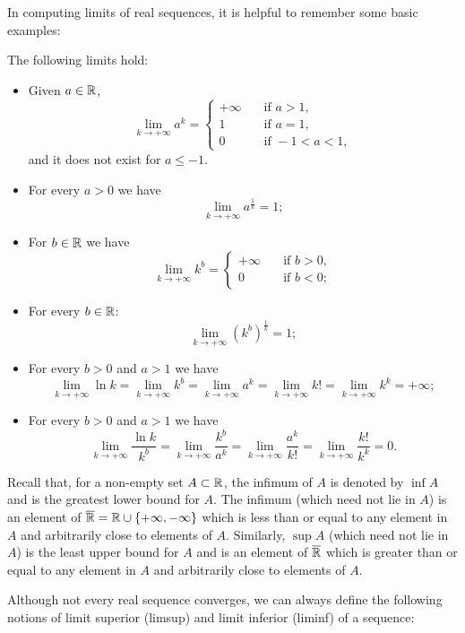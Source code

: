 \bigskip
In computing limits of real sequences, it is helpful to remember some basic examples:
\bigskip
\begin{proposition} The following limits hold:
	\begin{itemize}
		\item Given $a\in \mathbb{R}$,
		$$
		\lim_{k\to +\infty} a^k = 
		\begin{cases}
		+ \infty \quad & \textrm{if } a>1,\\
		1 \quad & \textrm{if } a=1,\\
		0 \quad & \textrm{if } -1 < a < 1,
		\end{cases}
		$$
		and it does not exist for $a\leq -1$.
		\item For every $a>0$ we have 
		$$
		\lim_{k\to +\infty} a^{\frac1k} =1;
		$$
		\item For $b\in \mathbb{R}$ we have 
		$$
		\lim_{k\to +\infty} k^b = \begin{cases}
		+\infty \quad & \textrm{if } b>0,\\
		0 \quad & \textrm{if } b<0;
		\end{cases}
		$$
		\item For every $b\in \mathbb{R}$:
		$$
		\lim_{k\to +\infty} (k^b)^{\frac1k} =1;
		$$
		\item For every $b>0$ and $a>1$ we have 
		$$
		\lim_{k\to +\infty} \ln k = \lim_{k\to +\infty} k^b = \lim_{k\to +\infty} a^k = \lim_{k\to +\infty} k! = \lim_{k\to +\infty} k^k = +\infty;
		$$
		\item For every $b>0$ and $a>1$ we have 
		$$
		\lim_{k\to +\infty} \frac{\ln k}{k^b} = \lim_{k\to +\infty} \frac{k^b}{a^k} = \lim_{k\to +\infty} \frac{a^k}{k!} = \lim_{k\to +\infty} \frac{k!}{k^k} =0. 
		$$
	\end{itemize}

\bigskip
\begin{remark}
	Recall that, for a non-empty set $A\subset \mathbb{R} $, the infimum of $A$ is denoted by $\inf A$ and is the greatest lower bound for $A$. The infimum (which need not lie in $A$) is an element of $\overline{\mathbb{R}}=\mathbb{R} \cup\{+\infty, -\infty \}$  which is less than  or equal to any element in $A$ and arbitrarily close to elements of $A$.
	Similarly, $\sup A$ (which need not lie in $A$) is the least upper bound for $A$ and is an element of $\overline{\mathbb{R}}$  which is greater than or equal to any element in $A$ and arbitrarily close to elements of $A$.
\end{remark}

Although not every real sequence converges, we can always define the following notions of limit superior (limsup) and limit inferior (liminf) of a sequence:



\end{proposition}
